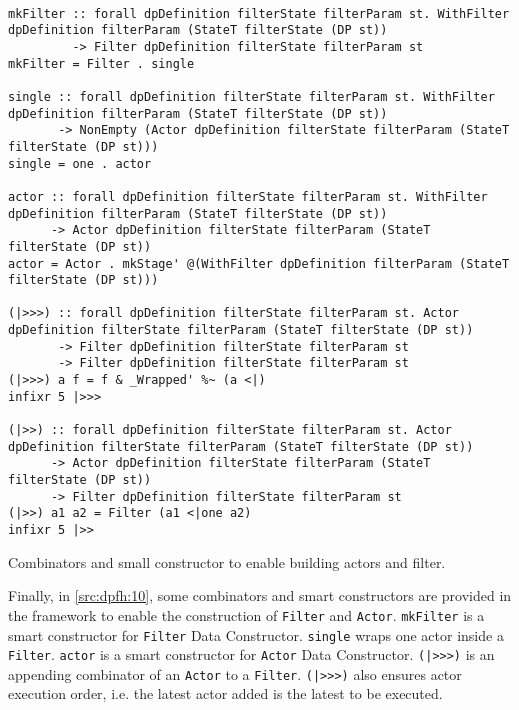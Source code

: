 \begin{listing}[H]
  \begin{verbatim}

mkFilter :: forall dpDefinition filterState filterParam st. WithFilter dpDefinition filterParam (StateT filterState (DP st)) 
         -> Filter dpDefinition filterState filterParam st
mkFilter = Filter . single

single :: forall dpDefinition filterState filterParam st. WithFilter dpDefinition filterParam (StateT filterState (DP st)) 
       -> NonEmpty (Actor dpDefinition filterState filterParam (StateT filterState (DP st)))
single = one . actor

actor :: forall dpDefinition filterState filterParam st. WithFilter dpDefinition filterParam (StateT filterState (DP st)) 
      -> Actor dpDefinition filterState filterParam (StateT filterState (DP st))
actor = Actor . mkStage' @(WithFilter dpDefinition filterParam (StateT filterState (DP st)))

(|>>>) :: forall dpDefinition filterState filterParam st. Actor dpDefinition filterState filterParam (StateT filterState (DP st)) 
       -> Filter dpDefinition filterState filterParam st 
       -> Filter dpDefinition filterState filterParam st
(|>>>) a f = f & _Wrapped' %~ (a <|)
infixr 5 |>>>

(|>>) :: forall dpDefinition filterState filterParam st. Actor dpDefinition filterState filterParam (StateT filterState (DP st)) 
      -> Actor dpDefinition filterState filterParam (StateT filterState (DP st)) 
      -> Filter dpDefinition filterState filterParam st
(|>>) a1 a2 = Filter (a1 <|one a2)
infixr 5 |>>
  \end{verbatim}
  \caption[{[\texttt{Stage.hs}] Filter / Actor smart constructors and combinators}]{Combinators and small constructor to enable building actors and filter.}
  \label{src:dpfh:10}
\end{listing}

Finally, in \autoref{src:dpfh:10}, some combinators and smart constructors are provided in the framework to enable the construction of \texttt{Filter} and \texttt{Actor}.
\texttt{mkFilter} is a smart constructor for \texttt{Filter} Data Constructor. \texttt{single} wraps one actor inside a \texttt{Filter}.
\texttt{actor} is a smart constructor for \texttt{Actor} Data Constructor. \texttt{(|>>>)} is an appending combinator of an \texttt{Actor} to a \texttt{Filter}. 
\texttt{(|>>>)} also ensures actor execution order, i.e. the latest actor added is the latest to be executed.


